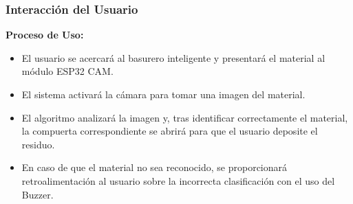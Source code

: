 \subsubsection{Interacción del Usuario}

\textbf{Proceso de Uso:}
\begin{itemize}
    \item El usuario se acercará al basurero inteligente y presentará el material al módulo ESP32 CAM.
    \item El sistema activará la cámara para tomar una imagen del material.
    \item El algoritmo analizará la imagen y, tras identificar correctamente el material, la compuerta correspondiente se abrirá para que el usuario deposite el residuo.
    \item En caso de que el material no sea reconocido, se proporcionará retroalimentación al usuario sobre la incorrecta clasificación con el uso del Buzzer.
\end{itemize}
